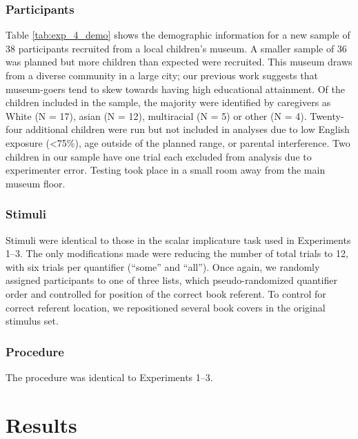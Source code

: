 \documentclass[man]{apa2}
\begin{document}
{\subsubsection{Participants}

Table \ref{tab:exp_4_demo} shows the demographic information for a new sample of 38 participants recruited from a local children's museum. A smaller sample of 36 was planned but more children than expected were recruited. This museum draws from a diverse community in a large city; our previous work suggests that museum-goers tend to skew towards having high educational attainment. Of the children included in the sample, the majority were identified by caregivers as White (N = 17), asian (N = 12), multiracial (N = 5) or other (N = 4). Twenty-four additional children were run but not included in analyses due to low English exposure (\textless 75\%), age outside of the planned range, or parental interference. Two children in our sample have one trial each excluded from analysis due to experimenter error. Testing took place in a small room away from the main museum floor.

\subsubsection{Stimuli}

Stimuli were identical to those in the scalar implicature task used in Experiments 1--3. The only modifications made were reducing the number of total trials to 12, with six trials per quantifier (``some'' and ``all''). Once again, we randomly assigned participants to one of three lists, which pseudo-randomized quantifier order and controlled for position of the correct book referent. To control for correct referent location, we repositioned several book covers in the original stimulus set.

\subsubsection{Procedure}

The procedure was identical to Experiments 1--3.

\section{Results}

}
\end{document}
